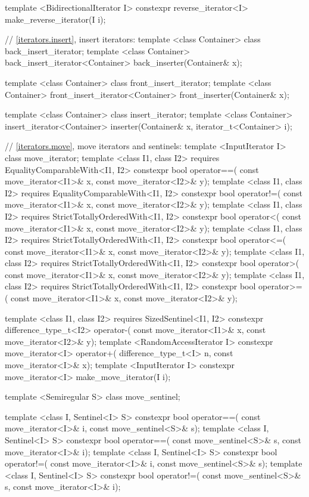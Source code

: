 \begin{codeblock}
{{{{  template <BidirectionalIterator I>
    constexpr reverse_iterator<I> make_reverse_iterator(I i);

  // \ref{iterators.insert}, insert iterators:
  template <class Container> class back_insert_iterator;
  template <class Container>
    back_insert_iterator<Container> back_inserter(Container& x);

  template <class Container> class front_insert_iterator;
  template <class Container>
    front_insert_iterator<Container> front_inserter(Container& x);

  template <class Container> class insert_iterator;
  template <class Container>
    insert_iterator<Container> inserter(Container& x, iterator_t<Container> i);

  // \ref{iterators.move}, move iterators and sentinels:
  template <InputIterator I> class move_iterator;
  template <class I1, class I2>
      requires EqualityComparableWith<I1, I2>
    constexpr bool operator==(
      const move_iterator<I1>& x, const move_iterator<I2>& y);
  template <class I1, class I2>
      requires EqualityComparableWith<I1, I2>
    constexpr bool operator!=(
      const move_iterator<I1>& x, const move_iterator<I2>& y);
  template <class I1, class I2>
      requires StrictTotallyOrderedWith<I1, I2>
    constexpr bool operator<(
      const move_iterator<I1>& x, const move_iterator<I2>& y);
  template <class I1, class I2>
      requires StrictTotallyOrderedWith<I1, I2>
    constexpr bool operator<=(
      const move_iterator<I1>& x, const move_iterator<I2>& y);
  template <class I1, class I2>
      requires StrictTotallyOrderedWith<I1, I2>
    constexpr bool operator>(
      const move_iterator<I1>& x, const move_iterator<I2>& y);
  template <class I1, class I2>
      requires StrictTotallyOrderedWith<I1, I2>
    constexpr bool operator>=(
      const move_iterator<I1>& x, const move_iterator<I2>& y);

  template <class I1, class I2>
      requires SizedSentinel<I1, I2>
    constexpr difference_type_t<I2> operator-(
      const move_iterator<I1>& x,
      const move_iterator<I2>& y);
  template <RandomAccessIterator I>
    constexpr move_iterator<I> operator+(
      difference_type_t<I> n,
      const move_iterator<I>& x);
  template <InputIterator I>
    constexpr move_iterator<I> make_move_iterator(I i);

  template <Semiregular S> class move_sentinel;

  template <class I, Sentinel<I> S>
    constexpr bool operator==(
      const move_iterator<I>& i, const move_sentinel<S>& s);
  template <class I, Sentinel<I> S>
    constexpr bool operator==(
      const move_sentinel<S>& s, const move_iterator<I>& i);
  template <class I, Sentinel<I> S>
    constexpr bool operator!=(
      const move_iterator<I>& i, const move_sentinel<S>& s);
  template <class I, Sentinel<I> S>
    constexpr bool operator!=(
      const move_sentinel<S>& s, const move_iterator<I>& i);

}}}}
\end{codeblock}
